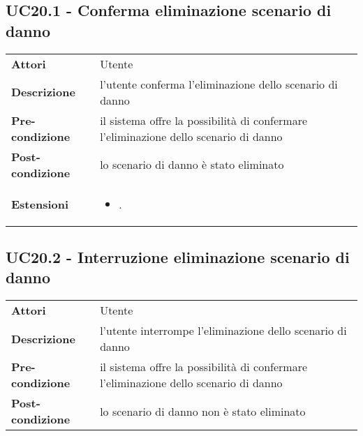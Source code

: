\subsection{UC20.1 - Conferma eliminazione scenario di danno}
\label{sssec:UC20.1}
\def\arraystretch{1.5}
\begin{tabularx}{\textwidth}{l|p{}}
\rowcolor{I} \multicolumn{2}{c}{\color{white}\textbf{UC20.1 - Conferma eliminazione scenario di danno}} \\
\toprule
\endhead
\textbf{Attori} & Utente\\
\textbf{Descrizione} & l'utente conferma l'eliminazione dello scenario di danno\\
\textbf{Pre-condizione} & il sistema offre la possibilità di confermare l'eliminazione dello scenario di danno\\
\textbf{Post-condizione} & lo scenario di danno è stato eliminato\\
\textbf{Estensioni} & \vspace{-1.2em}\begin{itemize}[leftmargin=*,noitemsep,nosep]
\item \nameref{sssec:UC20.2}.
\end{itemize}\\
\bottomrule
\end{tabularx}
\subsection{UC20.2 - Interruzione eliminazione scenario di danno}
\label{sssec:UC20.2}
\def\arraystretch{1.5}
\begin{tabularx}{\textwidth}{l|p{}}
\rowcolor{I} \multicolumn{2}{c}{\color{white}\textbf{UC20.2 - Interruzione eliminazione scenario di danno}} \\
\toprule
\endhead
\textbf{Attori} & Utente\\
\textbf{Descrizione} & l'utente interrompe l'eliminazione dello scenario di danno\\
\textbf{Pre-condizione} & il sistema offre la possibilità di confermare l'eliminazione dello scenario di danno\\
\textbf{Post-condizione} & lo scenario di danno non è stato eliminato\\
\bottomrule
\end{tabularx}

